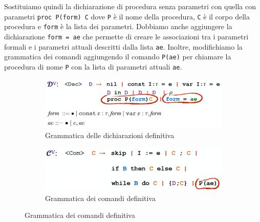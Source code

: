 \documentclass[a4paper,oneside,titlepage]{book}
\begin{document}
Sostituiamo quindi la dichiarazione di procedura senza parametri con quella con parametri \lstinline|proc P(form) C| dove \lstinline|P| è il nome della procedura, \lstinline|C| è il corpo della procedura e \lstinline|form| è la lista dei parametri. Dobbiamo anche aggiungere la dichiarazione \lstinline|form = ae| che permette di creare le associazioni tra i parametri formali e i parametri attuali descritti dalla lista \lstinline|ae|. Inoltre, modifichiamo la grammatica dei comandi aggiungendo il comando \lstinline|P(ae)| per chiamare la procedura di nome \lstinline|P| con la lista di parametri attuali \lstinline|ae|.
\begin{figure}[htp]
	\begin{subfigure}{0.49\textwidth}
		\includegraphics[width=\textwidth, height=\textheight, keepaspectratio]{decProcPar.png} 
		\caption{Grammatica delle dichiarazioni definitiva}
	\end{subfigure}
	\hfill
	\begin{subfigure}{0.49\textwidth}
		\includegraphics[width=\textwidth, height=\textheight, keepaspectratio]{comProcPar.png}
		\caption{Grammatica dei comandi definitiva}
	\end{subfigure}
\end{figure}
\end{document}
